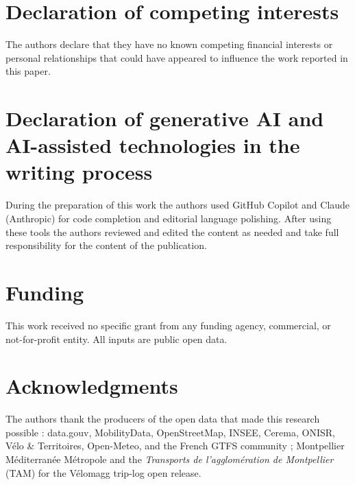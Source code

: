 \documentclass[11pt,a4paper]{article}
\begin{document}
\section*{Declaration of competing interests}
The authors declare that they have no known competing financial
interests or personal relationships that could have appeared to
influence the work reported in this paper.

\section*{Declaration of generative AI and AI-assisted technologies in the writing process}
During the preparation of this work the authors used GitHub
Copilot and Claude (Anthropic) for code completion and editorial
language polishing.  After using these tools the authors reviewed
and edited the content as needed and take full responsibility
for the content of the publication.

\section*{Funding}
This work received no specific grant from any funding agency,
commercial, or not-for-profit entity.  All inputs are public
open data.

\section*{Acknowledgments}
The authors thank the producers of the open data that made this
research possible : data.gouv, MobilityData, OpenStreetMap, INSEE,
Cerema, ONISR, V\'elo \& Territoires, Open-Meteo, and the French
GTFS community ; Montpellier M\'editerran\'ee M\'etropole and the
\emph{Transports de l'agglom\'eration de Montpellier} (TAM) for
the V\'elomagg trip-log open release.


\end{document}
